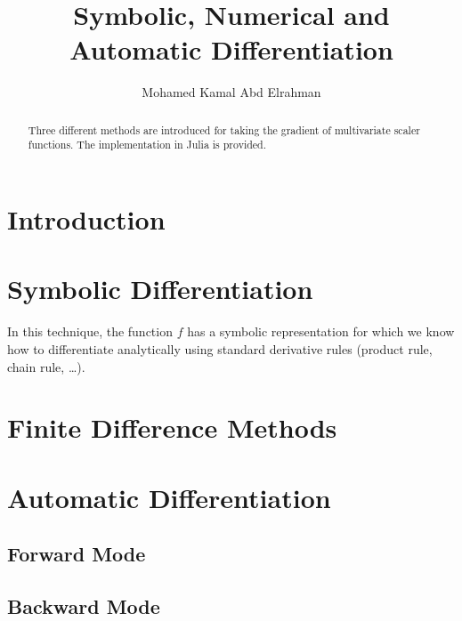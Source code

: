 \documentclass{tufte-handout}
\title{Symbolic, Numerical and Automatic Differentiation}
\author[mohamedkamal]{Mohamed Kamal Abd Elrahman}
\begin{document}
	\maketitle
	\begin{abstract}
		\noindent
		 Three different methods are introduced for taking the gradient of multivariate scaler functions. The implementation in Julia is provided. 
	\end{abstract}
	\section{Introduction}
	\section{Symbolic Differentiation}
	In this technique, the function $f$ has a symbolic representation for which we know how to differentiate analytically using standard derivative rules (product rule, chain rule, \dots). 

	 
	\section{Finite Difference Methods}
	\section{Automatic Differentiation}
	\subsection{Forward Mode}
	\subsection{Backward Mode}
\end{document}
